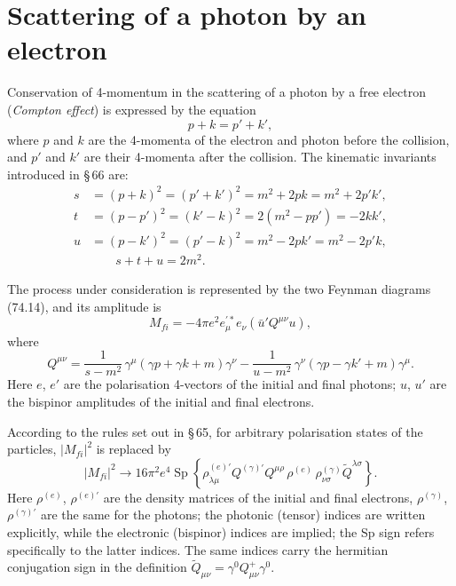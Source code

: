 
\section{Scattering of a photon by an electron}


Conservation of 4-momentum in the scattering of a photon by a free electron (\emph{Compton effect}) is expressed by the equation
\begin{equation}
p + k = p' + k',
\label{eq:86.1}
\end{equation}
where $p$ and $k$ are the 4-momenta of the electron and photon before the collision, and $p'$ and $k'$ are their 4-momenta after the collision. The kinematic invariants introduced in \S\,66 are:
\begin{equation}
\begin{aligned}
s &= (p+k)^2 = (p'+k')^2 = m^2 + 2pk = m^2 + 2p'k', \\
t &= (p-p')^2 = (k'-k)^2 = 2(m^2 - pp') = -2kk', \\
u &= (p-k')^2 = (p'-k)^2 = m^2 - 2pk' = m^2 - 2p'k, \\
&\qquad s + t + u = 2m^2.
\end{aligned}
\label{eq:86.2}
\end{equation}

The process under consideration is represented by the two Feynman diagrams (74.14), and its amplitude is
\begin{equation}
M_{fi} = -4\pi e^2 e_\mu^{\prime *} e_\nu (\bar{u}' Q^{\mu\nu} u),
\label{eq:86.3}
\end{equation}
where
\begin{equation}
Q^{\mu\nu} = \frac{1}{s - m^2}\,\gamma^\mu(\gamma p + \gamma k + m)\gamma^\nu - \frac{1}{u - m^2}\,\gamma^\nu(\gamma p - \gamma k' + m)\gamma^\mu.
\label{eq:86.4}
\end{equation}
Here $e$, $e'$ are the polarisation 4-vectors of the initial and final photons; $u$, $u'$ are the bispinor amplitudes of the initial and final electrons.

According to the rules set out in \S\,65, for arbitrary polarisation states of the particles, $|M_{fi}|^2$ is replaced by
\begin{equation}
|M_{fi}|^2 \to 16\pi^2 e^4 \operatorname{Sp}\!\left\{\rho^{(e)\prime}_{\dot{\lambda}\mu} Q^{(\gamma)\prime}_{\phantom{1}} Q^{\mu\rho}\, \rho^{(e)}\, \rho^{(\gamma)}_{\nu\sigma} \widetilde{Q}^{\lambda\sigma}\right\}.
\label{eq:86.5}
\end{equation}
Here $\rho^{(e)}$, $\rho^{(e)\prime}$ are the density matrices of the initial and final electrons, $\rho^{(\gamma)}$, $\rho^{(\gamma)\prime}$ are the same for the photons; the photonic (tensor) indices are written explicitly, while the electronic (bispinor) indices are implied; the Sp sign refers specifically to the latter indices. The same indices carry the hermitian conjugation sign in the definition $\widetilde{Q}_{\mu\nu} = \gamma^0 Q_{\mu\nu}^+ \gamma^0$.

